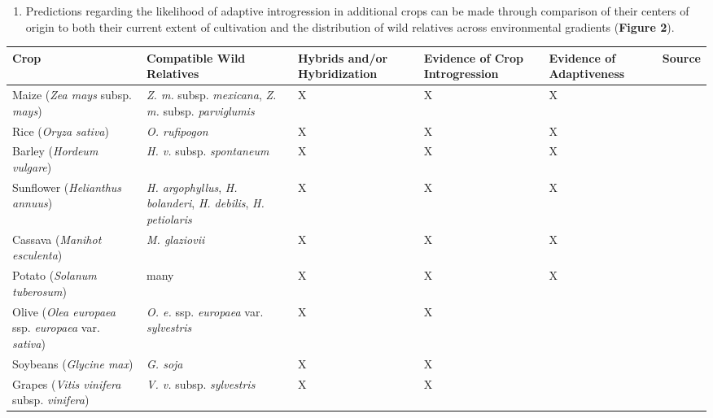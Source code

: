 \documentclass[11pt]{article}
\begin{document}
\begin{enumerate}
\begin{enumerate}
	\end{enumerate}
	\item{Predictions regarding the likelihood of adaptive introgression in additional crops can be made through comparison of their centers of origin to both their current extent of cultivation and the distribution of wild relatives across environmental gradients (\textbf{Figure 2}).}
	
	
	

	
	
	
	
	
	
	
	
\end{enumerate}



\begin{table}
\centering
\begin{adjustbox}{width=1\textwidth}
\small
\label{my-label}
\begin{tabular}{|p{5cm}|p{5cm}|p{2.6cm}|p{2.6cm}|p{2.6cm}|l|}
\hline
Crop & Compatible Wild Relatives & Hybrids and/or Hybridization & Evidence of Crop Introgression & Evidence of Adaptiveness & Source \\ \hline \hline
Maize (\emph{Zea mays} subsp. \emph{mays}) & \emph{Z. m.} subsp. \emph{mexicana}, \emph{Z. m. } subsp. \emph{parviglumis} & X & X & X & \cite{hufford2013genomic} \\ 
\hline 
Rice (\emph{Oryza sativa}) & \emph{O. rufipogon} & X & X & X & \cite{Huang2012} \\ 
\hline
Barley (\emph{Hordeum vulgare}) & \emph{H. v.} subsp. \emph{spontaneum} & X & X & X & \cite{Poets2015} \\ \hline
Sunflower (\emph{Helianthus annuus}) & \emph{H. argophyllus}, \emph{H. bolanderi}, \emph{H. debilis}, \emph{H. petiolaris} & X & X & X & \cite{rieseberg2007hybridization}\\ 
\hline
Cassava (\emph{Manihot esculenta}) & \emph{M. glaziovii} & X & X & X & \cite{bredeson2016sequencing} \\ 
\hline
Potato (\emph{Solanum tuberosum}) & many & X & X & X & \cite{johns1986ongoing} \\ \hline
Olive (\emph{Olea europaea} ssp. \emph{europaea} var. \emph{sativa}) & \emph{O. e.} ssp. \emph{europaea} var. \emph{sylvestris} & X & X & & \cite{diez2015olive} \\ 
\hline
Soybeans (\emph{Glycine max}) & \emph{G. soja} & X & X &  & \cite{lam2010resequencing} \\ 
\hline
Grapes (\emph{Vitis vinifera} subsp. \emph{vinifera}) & \emph{V. v.} subsp. \emph{sylvestris} & X & X &  &  \cite{myles2011genetic} \\
\hline
\end{tabular}
\end{adjustbox}
\end{table}
\end{document}
